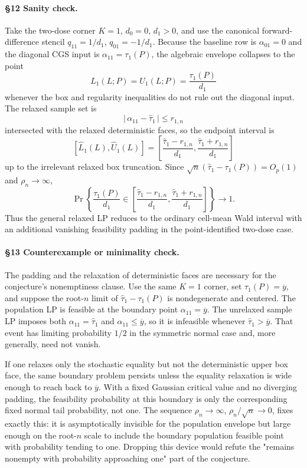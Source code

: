 \paragraph{\S12 Sanity check.}
Take the two-dose corner \(K=1\), \(d_0=0\), \(d_1>0\), and use the canonical
forward-difference stencil \(q_{11}=1/d_1\), \(q_{01}=-1/d_1\).  Because the
baseline row is \(\alpha_{01}=0\) and the diagonal CGS input is
\(\alpha_{11}=\tau_1(P)\), the algebraic envelope collapses to the point
\[
  L_1(L;P)=U_1(L;P)=\frac{\tau_1(P)}{d_1}
\]
whenever the box and regularity inequalities do not rule out the diagonal
input.  The relaxed sample set is
\[
  |\,\alpha_{11}-\widehat\tau_1\,|\le r_{1,n}
\]
intersected with the relaxed deterministic faces, so the endpoint interval is
\[
  [\widehat L_1(L),\widehat U_1(L)]
  =
  \left[
    \frac{\widehat\tau_1-r_{1,n}}{d_1},
    \frac{\widehat\tau_1+r_{1,n}}{d_1}
  \right]
\]
up to the irrelevant relaxed box truncation.  Since
\(\sqrt n(\widehat\tau_1-\tau_1(P))=O_p(1)\) and
\(\rho_n\to\infty\),
\[
  \Pr\left\{
    \frac{\tau_1(P)}{d_1}
    \in
    \left[
      \frac{\widehat\tau_1-r_{1,n}}{d_1},
      \frac{\widehat\tau_1+r_{1,n}}{d_1}
    \right]
  \right\}\to1 .
\]
Thus the general relaxed LP reduces to the ordinary cell-mean Wald interval
with an additional vanishing feasibility padding in the point-identified
two-dose case.

\paragraph{\S13 Counterexample or minimality check.}
The padding and the relaxation of deterministic faces are necessary for the
conjecture's nonemptiness clause.  Use the same \(K=1\) corner, set
\(\tau_1(P)=\overline y\), and suppose the root-\(n\) limit of
\(\widehat\tau_1-\tau_1(P)\) is nondegenerate and centered.  The population
LP is feasible at the boundary point \(\alpha_{11}=\overline y\).  The
unrelaxed sample LP imposes both \(\alpha_{11}=\widehat\tau_1\) and
\(\alpha_{11}\le\overline y\), so it is infeasible whenever
\(\widehat\tau_1>\overline y\).  That event has limiting probability
\(1/2\) in the symmetric normal case and, more generally, need not vanish.

If one relaxes only the stochastic equality but not the deterministic upper
box face, the same boundary problem persists unless the equality relaxation
is wide enough to reach back to \(\overline y\).  With a fixed Gaussian
critical value and no diverging padding, the feasibility probability at this
boundary is only the corresponding fixed normal tail probability, not one.
The sequence \(\rho_n\to\infty\), \(\rho_n/\sqrt n\to0\), fixes exactly this:
it is asymptotically invisible for the population envelope but large enough
on the root-\(n\) scale to include the boundary population feasible point
with probability tending to one.  Dropping this device would refute the
"remains nonempty with probability approaching one" part of the conjecture.
